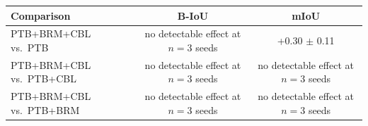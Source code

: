 \begin{tabular}{lcc}
\toprule
Comparison & B-IoU & mIoU \\
\midrule
PTB+BRM+CBL vs.\ PTB & no detectable effect at $n{=}3$ seeds & +0.30 $\pm$ 0.11 \\
PTB+BRM+CBL vs.\ PTB+CBL & no detectable effect at $n{=}3$ seeds & no detectable effect at $n{=}3$ seeds \\
PTB+BRM+CBL vs.\ PTB+BRM & no detectable effect at $n{=}3$ seeds & no detectable effect at $n{=}3$ seeds \\
\bottomrule
\end{tabular}
